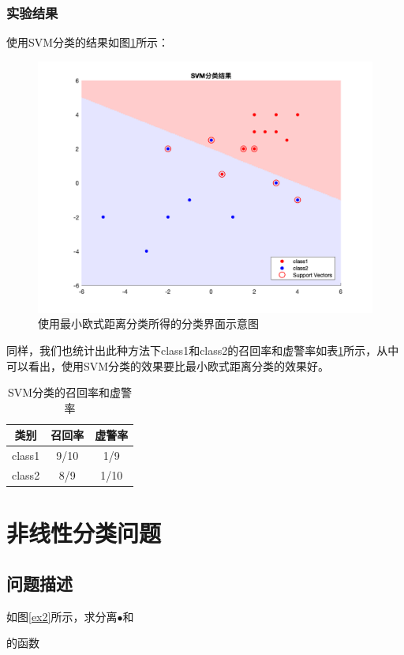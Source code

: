 \documentclass[cn]{elegantbook}
\begin{document}
\subsection{实验结果}
使用SVM分类的结果如图\ref{res4}所示：
\begin{figure}[!ht]
	\centering
	\includegraphics[width=\textwidth]{../results/LD2}
	\caption{\label{res4}使用最小欧式距离分类所得的分类界面示意图}
\end{figure}

同样，我们也统计出此种方法下class1和class2的召回率和虚警率如表\ref{tab2}所示，从中可以看出，使用SVM分类的效果要比最小欧式距离分类的效果好。

\begin{table}[!h]
	\centering\caption{\label{tab2}SVM分类的召回率和虚警率}
	\begin{tabular}{|c|c|c|}
		\hline
		类别 & 召回率 & 虚警率 \\
		\hline
		class1 & 9/10 & 1/9 \\
		\hline
		class2 & 8/9 & 1/10 \\
		\hline
	\end{tabular}
\end{table}
\chapter{非线性分类问题}
\section{问题描述}
如图\ref{ex2}所示，求分离{\color{red}$\bullet$}和的函数
\end{document}

